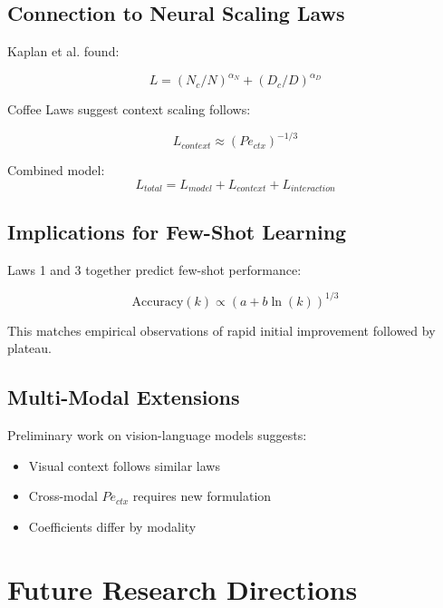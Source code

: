 \documentclass[conference]{IEEEtran}
\begin{document}
\subsection{Connection to Neural Scaling Laws}

Kaplan et al. \cite{kaplan2020scaling} found:

\begin{equation}
L = (N_c/N)^{\alpha_N} + (D_c/D)^{\alpha_D}
\end{equation}

Coffee Laws suggest context scaling follows:

\begin{equation}
L_{context} \approx (Pe_{ctx})^{-1/3}
\end{equation}

Combined model:
\begin{equation}
L_{total} = L_{model} + L_{context} + L_{interaction}
\end{equation}

\subsection{Implications for Few-Shot Learning}

Laws 1 and 3 together predict few-shot performance:

\begin{equation}
\text{Accuracy}(k) \propto (a + b\ln(k))^{1/3}
\end{equation}

This matches empirical observations of rapid initial improvement followed by plateau.

\subsection{Multi-Modal Extensions}

Preliminary work on vision-language models suggests:
\begin{itemize}
\item Visual context follows similar laws
\item Cross-modal $Pe_{ctx}$ requires new formulation
\item Coefficients differ by modality
\end{itemize}

\section{Future Research Directions}
\end{document}
